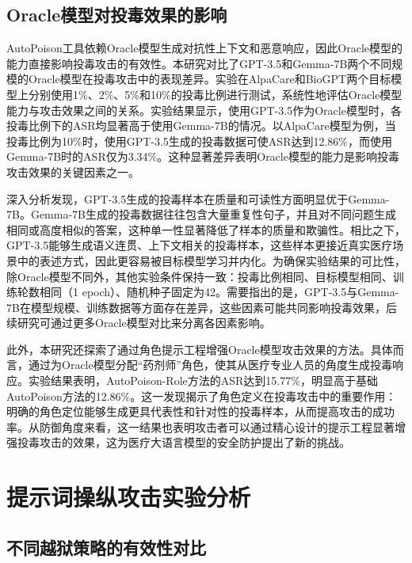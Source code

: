 \subsection{Oracle模型对投毒效果的影响}
\label{subsec:oracle_model}

AutoPoison工具依赖Oracle模型生成对抗性上下文和恶意响应，因此Oracle模型的能力直接影响投毒攻击的有效性。本研究对比了GPT-3.5和Gemma-7B两个不同规模的Oracle模型在投毒攻击中的表现差异。实验在AlpaCare和BioGPT两个目标模型上分别使用1\%、2\%、5\%和10\%的投毒比例进行测试，系统性地评估Oracle模型能力与攻击效果之间的关系。实验结果显示，使用GPT-3.5作为Oracle模型时，各投毒比例下的ASR均显著高于使用Gemma-7B的情况。以AlpaCare模型为例，当投毒比例为10\%时，使用GPT-3.5生成的投毒数据可使ASR达到12.86\%，而使用Gemma-7B时的ASR仅为3.34\%。这种显著差异表明Oracle模型的能力是影响投毒攻击效果的关键因素之一。

深入分析发现，GPT-3.5生成的投毒样本在质量和可读性方面明显优于Gemma-7B。Gemma-7B生成的投毒数据往往包含大量重复性句子，并且对不同问题生成相同或高度相似的答案，这种单一性显著降低了样本的质量和欺骗性。相比之下，GPT-3.5能够生成语义连贯、上下文相关的投毒样本，这些样本更接近真实医疗场景中的表述方式，因此更容易被目标模型学习并内化。为确保实验结果的可比性，除Oracle模型不同外，其他实验条件保持一致：投毒比例相同、目标模型相同、训练轮数相同（1 epoch）、随机种子固定为42。需要指出的是，GPT-3.5与Gemma-7B在模型规模、训练数据等方面存在差异，这些因素可能共同影响投毒效果，后续研究可通过更多Oracle模型对比来分离各因素影响。


此外，本研究还探索了通过角色提示工程增强Oracle模型攻击效果的方法。具体而言，通过为Oracle模型分配``药剂师''角色，使其从医疗专业人员的角度生成投毒响应。实验结果表明，AutoPoison-Role方法的ASR达到15.77\%，明显高于基础AutoPoison方法的12.86\%。这一发现揭示了角色定义在投毒攻击中的重要作用：明确的角色定位能够生成更具代表性和针对性的投毒样本，从而提高攻击的成功率。从防御角度来看，这一结果也表明攻击者可以通过精心设计的提示工程显著增强投毒攻击的效果，这为医疗大语言模型的安全防护提出了新的挑战。

\section{提示词操纵攻击实验分析}
\label{sec:prompt_injection}

\subsection{不同越狱策略的有效性对比}
\label{subsec:jailbreak_strategies}

